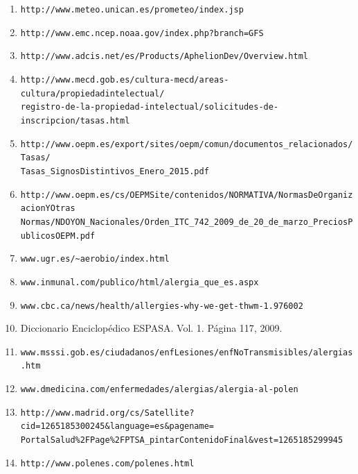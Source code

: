 \documentclass[12pt,oneside,a4paper]{article}
\numberwithin{figure}{section}
\begin{document}
\begin{enumerate}
\item \verb|http://www.meteo.unican.es/prometeo/index.jsp|
\label{ref:Prometeo}

\item \verb|http://www.emc.ncep.noaa.gov/index.php?branch=GFS|
\label{ref:GFS}

\item \verb|http://www.adcis.net/es/Products/AphelionDev/Overview.html|
\label{ref:ADCIS}

\item \verb|http://www.mecd.gob.es/cultura-mecd/areas-cultura/propiedadintelectual/|
\\ \verb|registro-de-la-propiedad-intelectual/solicitudes-de-inscripcion/tasas.html |
\label{ref:prop_int}

\item \verb|http://www.oepm.es/export/sites/oepm/comun/documentos_relacionados/Tasas/|
\\ \verb|Tasas_SignosDistintivos_Enero_2015.pdf|
\label{ref:pat1}

\item \verb|http://www.oepm.es/cs/OEPMSite/contenidos/NORMATIVA/NormasDeOrganizacionYOtras|
\\ \verb|Normas/NDOYON_Nacionales/Orden_ITC_742_2009_de_20_de_marzo_PreciosPublicosOEPM.pdf|
\label{ref:pat2}

\item \verb|www.ugr.es/~aerobio/index.html|
\label{ref:ugr}


\item \verb|www.inmunal.com/publico/html/alergia_que_es.aspx|

\item \verb|www.cbc.ca/news/health/allergies-why-we-get-thwm-1.976002|

\item Diccionario Enciclopédico ESPASA. Vol. 1. Página 117, 2009.

\item \verb|www.msssi.gob.es/ciudadanos/enfLesiones/enfNoTransmisibles/alergias.htm|

\item \verb|www.dmedicina.com/enfermedades/alergias/alergia-al-polen|

\item \verb|http://www.madrid.org/cs/Satellite?cid=1265185300245&language=es&pagename=|
\\ \verb|PortalSalud%2FPage%2FPTSA_pintarContenidoFinal&vest=1265185299945|

\item \verb|http://www.polenes.com/polenes.html|


\end{enumerate}
\end{document}
